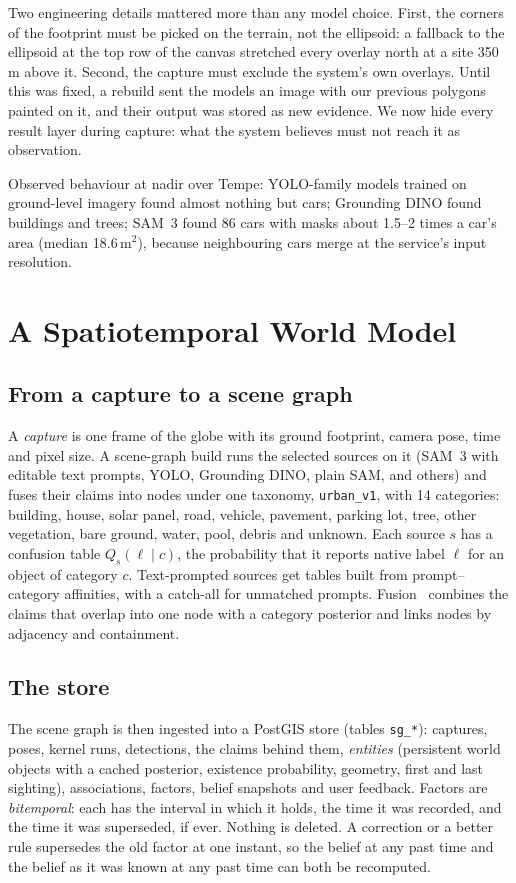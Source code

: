 \documentclass[journal]{IEEEtran}
\newcommand{\code}[1]{\texttt{#1}}
\begin{document}
Two engineering details mattered more than any model choice. First, the corners of the footprint
must be picked on the terrain, not the ellipsoid: a fallback to the ellipsoid at the top row of the
canvas stretched every overlay north at a site 350\,m above it. Second, the capture must exclude the
system's own overlays. Until this was fixed, a rebuild sent the models an image with our previous
polygons painted on it, and their output was stored as new evidence. We now hide every result
layer during capture: what the system believes must not reach it as observation.

Observed behaviour at nadir over Tempe: YOLO-family models trained on ground-level imagery found
almost nothing but cars; Grounding DINO found buildings and trees; SAM~3 found 86 cars with masks
about 1.5--2 times a car's area (median 18.6\,m$^2$), because neighbouring cars merge at the
service's input resolution.

\section{A Spatiotemporal World Model}
\label{sec:world}

\subsection{From a capture to a scene graph}
A \emph{capture} is one frame of the globe with its ground footprint, camera pose, time and pixel
size. A scene-graph build runs the selected sources on it (SAM~3 with editable text prompts, YOLO,
Grounding DINO, plain SAM, and others) and fuses their claims into nodes under one taxonomy,
\code{urban\_v1}, with 14 categories: building, house, solar panel, road, vehicle, pavement, parking
lot, tree, other vegetation, bare ground, water, pool, debris and unknown. Each source $s$ has a
confusion table $Q_s(\ell \mid c)$, the probability that it reports native label $\ell$ for an
object of category $c$. Text-prompted sources get tables built from prompt--category affinities,
with a catch-all for unmatched prompts. Fusion~\cite{kernelcal} combines the claims that overlap
into one node with a category posterior and links nodes by adjacency and containment.

\subsection{The store}
The scene graph is then ingested into a PostGIS store (tables \code{sg\_*}): captures, poses,
kernel runs, detections, the claims behind them, \emph{entities} (persistent world objects with a
cached posterior, existence probability, geometry, first and last sighting), associations,
factors, belief snapshots and user feedback. Factors are \emph{bitemporal}: each has the interval
in which it holds, the time it was recorded, and the time it was superseded, if ever. Nothing is
deleted. A correction or a better rule supersedes the old factor at one instant, so the belief at
any past time and the belief as it was known at any past time can both be recomputed.
\end{document}
